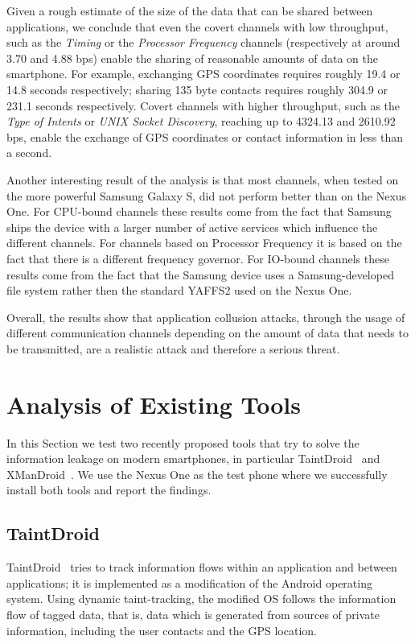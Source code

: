 Given a rough estimate of the size of the data that can be shared
between applications, we conclude that even the covert channels with
low throughput, such as the \emph{Timing} or the \emph{Processor
  Frequency} channels (respectively at around 3.70 and 4.88 bps)
enable the sharing of reasonable amounts of data on the
smartphone. For example, exchanging GPS coordinates requires roughly
19.4 or 14.8 seconds respectively; sharing 135 byte contacts requires
roughly 304.9 or 231.1 seconds respectively. Covert channels with
higher throughput, such as the \emph{Type of Intents} or \emph{UNIX
  Socket Discovery}, reaching up to 4324.13 and 2610.92 bps, enable
the exchange of GPS coordinates or contact information in less than a
second.

Another interesting result of the analysis is that most channels, when
tested on the more powerful Samsung Galaxy S, did not perform better
than on the Nexus One. For CPU-bound channels these results come from
the fact that Samsung ships the device with a larger number of active
services which influence the different channels. For channels based on
Processor Frequency it is based on the fact that there is a different
frequency governor. For IO-bound channels these results come from the
fact that the Samsung device uses a Samsung-developed file system
rather then the standard YAFFS2 used on the Nexus One.

Overall, the results show that application collusion attacks, through
the usage of different communication channels depending on the amount
of data that needs to be transmitted, are a realistic attack and
therefore a serious threat.

\section{Analysis of Existing Tools}
\label{sec:sp_appcollusion_analysis-existing-solutions}
In this Section we test two recently proposed tools that try to solve
the information leakage on modern smartphones, in particular
TaintDroid~\cite{taintdroid} and XManDroid~\cite{newxmandroid}. We use
the Nexus One as the test phone where we successfully install both
tools and report the findings.

\subsection{TaintDroid}

TaintDroid~\cite{taintdroid} tries to track information flows within
an application and between applications; it is implemented as a
modification of the Android operating system. Using dynamic
taint-tracking, the modified OS follows the information flow of tagged
data, that is, data which is generated from sources of private
information, including the user contacts and the GPS location.

